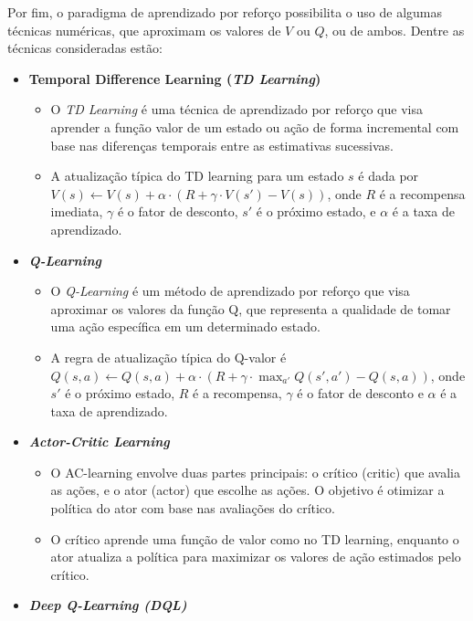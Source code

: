 Por fim, o paradigma de aprendizado por reforço possibilita o uso de algumas técnicas numéricas, que aproximam os valores de $V$ ou $Q$, ou de ambos. Dentre as técnicas consideradas estão:
\begin{itemize}
	\item \textbf{Temporal Difference Learning (\textit{TD Learning})}
	\begin{itemize}
		\item O \textit{TD Learning} é uma técnica de aprendizado por reforço que visa aprender a função valor de um estado ou ação de forma incremental com base nas diferenças temporais entre as estimativas sucessivas.
		\item A atualização típica do TD learning para um estado \(s\) é dada por \(V(s) \leftarrow V(s) + \alpha \cdot (R + \gamma \cdot V(s') - V(s))\), onde $R$ é a recompensa imediata, \(\gamma\) é o fator de desconto, \(s'\) é o próximo estado, e \(\alpha\) é a taxa de aprendizado.
	\end{itemize}
	
	\item \textbf{\textit{Q-Learning}}
	\begin{itemize}
		\item O \textit{Q-Learning} é um método de aprendizado por reforço que visa aproximar os valores da função Q, que representa a qualidade de tomar uma ação específica em um determinado estado.
		\item A regra de atualização típica do Q-valor é \(Q(s, a) \leftarrow Q(s, a) + \alpha \cdot (R + \gamma \cdot \max_{a'} Q(s', a') - Q(s, a))\), onde \(s'\) é o próximo estado, \(R\) é a recompensa, \(\gamma\) é o fator de desconto e \(\alpha\) é a taxa de aprendizado.
	\end{itemize}
	
	\item \textbf{\textit{Actor-Critic Learning}}
	
	\begin{itemize}
		\item O AC-learning envolve duas partes principais: o crítico (critic) que avalia as ações, e o ator (actor) que escolhe as ações. O objetivo é otimizar a política do ator com base nas avaliações do crítico.
		\item O crítico aprende uma função de valor como no TD learning, enquanto o ator atualiza a política para maximizar os valores de ação estimados pelo crítico.
	\end{itemize}
	
	\item \textbf{\textit{Deep Q-Learning (DQL)}}
	

\end{itemize}
